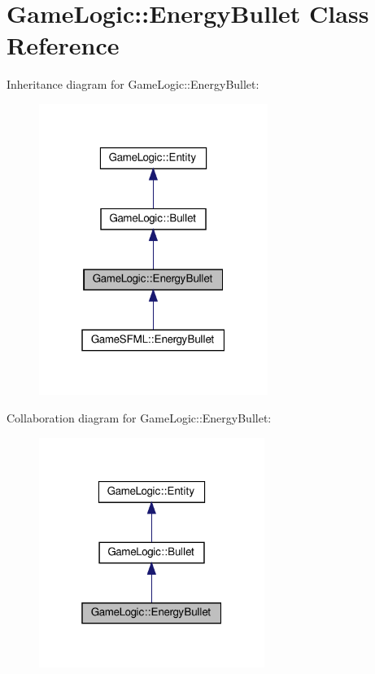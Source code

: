 \hypertarget{classGameLogic_1_1EnergyBullet}{}\section{Game\+Logic\+:\+:Energy\+Bullet Class Reference}
\label{classGameLogic_1_1EnergyBullet}


Inheritance diagram for Game\+Logic\+:\+:Energy\+Bullet\+:
\nopagebreak
\begin{figure}[H]
\begin{center}
\leavevmode
\includegraphics[width=211pt]{classGameLogic_1_1EnergyBullet__inherit__graph}
\end{center}
\end{figure}


Collaboration diagram for Game\+Logic\+:\+:Energy\+Bullet\+:
\nopagebreak
\begin{figure}[H]
\begin{center}
\leavevmode
\includegraphics[width=208pt]{classGameLogic_1_1EnergyBullet__coll__graph}
\end{center}
\end{figure}
